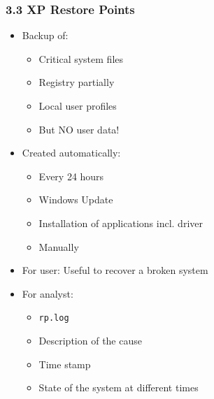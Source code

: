 \begin{frame}[fragile]
  \frametitle{3.3 XP Restore Points}
    \begin{itemize}
        \item Backup of:
        \begin{itemize}
	    \item Critical system files
	    \item Registry partially
            \item Local user profiles
            \item But NO user data!
        \end{itemize}
        \item Created automatically:
        \begin{itemize}
            \item Every 24 hours
            \item Windows Update
	    \item Installation of applications incl. driver
            \item Manually
        \end{itemize}
        \item For user: Useful to recover a broken system
        \item For analyst:
        \begin{itemize}
	    \item \texttt{rp.log}
            \item Description of the cause
            \item Time stamp
            \item State of the system at different times
        \end{itemize}
    \end{itemize}
\end{frame}


